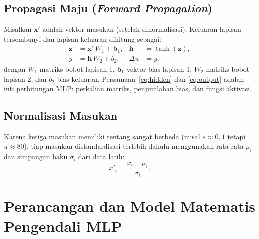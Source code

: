 \subsection{Propagasi Maju (\emph{Forward Propagation})}
\label{sub:forward}
Misalkan $\mathbf{x'}$ adalah vektor masukan (setelah dinormalisasi). Keluaran
lapisan tersembunyi dan lapisan keluaran dihitung sebagai:
\begin{align}
\mathbf{z} &= \mathbf{x'}\,W_1 + \mathbf{b}_1, &
\mathbf{h} &= \tanh(\mathbf{z}), \label{eq:hidden}\\
y &= \mathbf{h}\,W_2 + b_2, & \Delta u &= y. \label{eq:output}
\end{align}
dengan $W_1$ matriks bobot lapisan 1, $\mathbf{b}_1$ vektor bias lapisan 1, $W_2$
matriks bobot lapisan 2, dan $b_2$ bias keluaran. Persamaan~\eqref{eq:hidden} dan
\eqref{eq:output} adalah inti perhitungan MLP: perkalian matriks, penjumlahan bias,
dan fungsi aktivasi.

\subsection{Normalisasi Masukan}
\label{sub:scaling}
Karena ketiga masukan memiliki rentang sangat berbeda (misal $e\approx0{,}1$ tetapi
$u\approx80$), tiap masukan distandardisasi terlebih dahulu menggunakan rata-rata
$\mu_i$ dan simpangan baku $\sigma_i$ dari data latih:
\begin{equation}
x'_i = \frac{x_i - \mu_i}{\sigma_i}.
\label{eq:scaling}
\end{equation}

\section{Perancangan dan Model Matematis Pengendali MLP}
\label{sec:perancangan-mlp}

